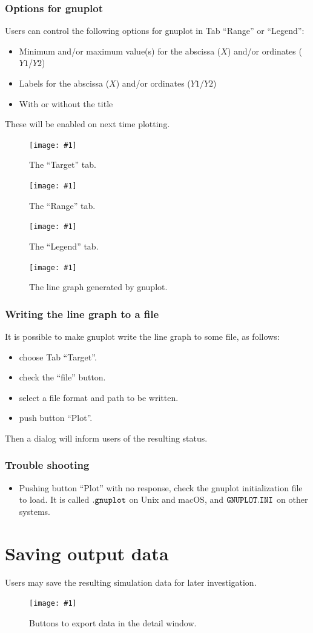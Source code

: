 \documentclass[a4paper,10pt]{report}
\newcommand\FigureOfImage[2]{\begin{figure}[h]
  \centering
  \texttt{[image: \#1]}
  \caption{#2}\label{fig:#1}
\end{figure}}
\begin{document}
\subsubsection{Options for gnuplot}
Users can control the following options for gnuplot in Tab ``Range'' or ``Legend'':
\begin{itemize}
\item Minimum and/or maximum value(s) for the abscissa ($X$) and/or ordinates ($Y1$/$Y2$)
\item Labels for the abscissa ($X$) and/or ordinates ($Y1$/$Y2$)
\item With or without the title
\end{itemize}
These will be enabled on next time plotting.
\FigureOfImage{lr-plot-target}{The ``Target'' tab.}
\FigureOfImage{lr-plot-range}{The ``Range'' tab.}
\FigureOfImage{lr-plot-legend}{The ``Legend'' tab.}
\FigureOfImage{lr-gnuplot}{The line graph generated by gnuplot.}

\subsubsection{Writing the line graph to a file}
It is possible to make gnuplot write the line graph to some file, as follows:
\begin{itemize}
\item choose Tab ``Target''.
\item check the ``file'' button.
\item select a file format and path to be written.
\item push button ``Plot''.
\end{itemize}
Then a dialog will inform users of the resulting status.

\subsubsection{Trouble shooting}
\begin{itemize}
\item Pushing button ``Plot'' with no response, check the gnuplot initialization
  file to load. It is called $\tt{.gnuplot}$ on Unix and macOS, and
  $\tt{GNUPLOT.INI}$ on other systems.
\end{itemize}

\section{Saving output data}
Users may save the resulting simulation data for later investigation.
\FigureOfImage{lr-detail-buttons}{Buttons to export data in the detail window.}
\end{document}
